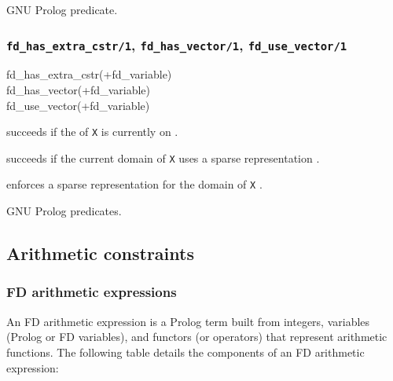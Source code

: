 \Portability

GNU Prolog predicate.

\subsubsection{\texttt{fd\_has\_extra\_cstr/1},
\texttt{fd\_has\_vector/1},
\texttt{fd\_use\_vector/1}}

\begin{TemplatesOneCol}
fd\_has\_extra\_cstr(+fd\_variable)\\
fd\_has\_vector(+fd\_variable)\\
fd\_use\_vector(+fd\_variable)

\end{TemplatesOneCol}

\Description

 succeeds if the 
of \texttt{X} is currently on .

 succeeds if the current domain of \texttt{X}
uses a sparse representation .

 enforces a sparse representation for the domain
of \texttt{X} .

\begin{PlErrors}



\end{PlErrors}

\Portability

GNU Prolog predicates.

\subsection{Arithmetic constraints}

\subsubsection{FD arithmetic expressions}
\label{FD-arithmetic-expressions}
An FD arithmetic expression is a Prolog term built from integers, variables
(Prolog or FD variables), and functors (or operators) that represent
arithmetic functions. The following table details the components of an FD
arithmetic expression:


